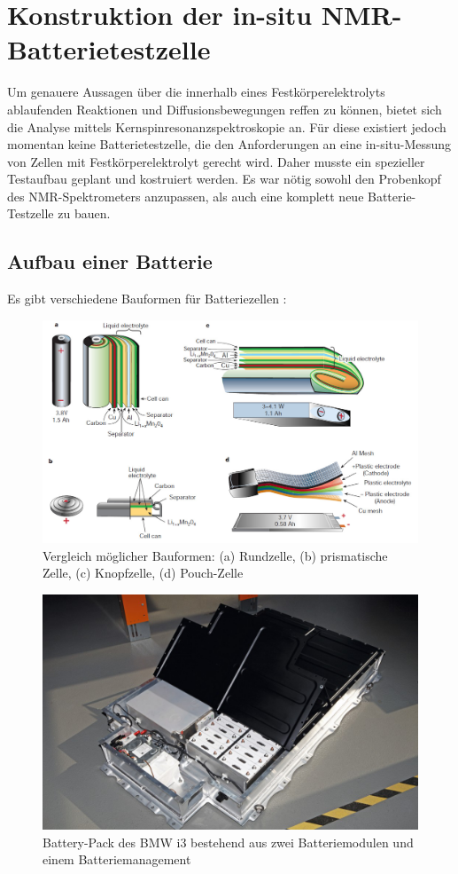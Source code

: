 \documentclass[a4paper, 11pt, headsepline,footsepline,twoside,abstract]{scrbook}
\begin{document}
\chapter{Konstruktion der in-situ NMR-Batterietestzelle}
Um genauere Aussagen über die innerhalb eines Festkörperelektrolyts ablaufenden Reaktionen und Diffusionsbewegungen reffen zu können, bietet sich die Analyse mittels Kernspinresonanzspektroskopie an. Für diese existiert jedoch momentan keine Batterietestzelle, die den Anforderungen an eine in-situ-Messung von Zellen mit Festkörperelektrolyt gerecht wird. Daher musste ein spezieller Testaufbau geplant und kostruiert werden. Es war nötig sowohl den Probenkopf des NMR-Spektrometers anzupassen, als auch eine komplett neue Batterie-Testzelle zu bauen.
\section{Aufbau einer Batterie}
Es gibt verschiedene Bauformen für Batteriezellen \cite{tarascon2001issues}:
\begin{figure}
	\centering
	\includegraphics[width=1.0\columnwidth]{images/uebersicht_bauformen.jpg}
	\caption{Vergleich möglicher Bauformen: (a) Rundzelle, (b) prismatische Zelle, (c) Knopfzelle, (d) Pouch-Zelle \cite{tarascon2001issues}}
	\label{vergleich_zellform}
\end{figure}
\begin{figure}
	\centering
	\includegraphics[width=0.9\columnwidth]{images/bmw-i3-battery-pack.png}
	\caption{Battery-Pack des BMW i3 bestehend aus zwei Batteriemodulen und einem Batteriemanagement \cite{bmwblog}}
	\label{battery_pack}
\end{figure}
\end{document}
